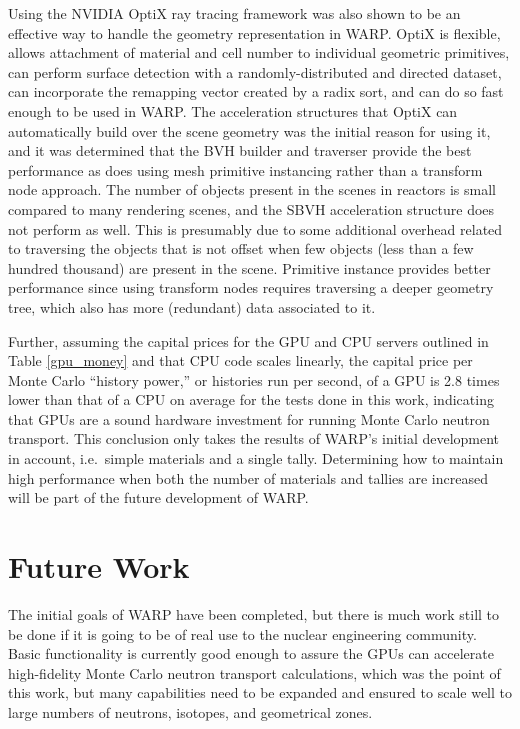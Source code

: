 Using the NVIDIA OptiX ray tracing framework was also shown to be an effective way to handle the geometry representation in WARP.  OptiX is flexible, allows attachment of material and cell number to individual geometric primitives, can perform surface detection with a randomly-distributed and directed dataset, can incorporate the remapping vector created by a radix sort, and can do so fast enough to be used in WARP.  The acceleration structures that OptiX can automatically build over the scene geometry was the initial reason for using it, and it was determined that the BVH builder and traverser provide the best performance as does using mesh primitive instancing rather than a transform node approach.  The number of objects present in the scenes in reactors is small compared to many rendering scenes, and the SBVH acceleration structure does not perform as well. This is presumably due to some additional overhead related to traversing the objects that is not offset when few objects (less than a few hundred thousand) are present in the scene.  Primitive instance provides better performance since using transform nodes requires traversing a deeper geometry tree, which also has more (redundant) data associated to it.

Further, assuming the capital prices for the GPU and CPU servers outlined in Table \ref{gpu_money} and that CPU code scales linearly, the capital price per Monte Carlo ``history power,'' or histories run per second, of a GPU is 2.8 times lower than that of a CPU on average for the tests done in this work, indicating that GPUs are a sound hardware investment for running Monte Carlo neutron transport.%
 This conclusion only takes the results of WARP's initial development in account, i.e.\ simple materials and a single tally.  Determining how to maintain high performance when both the number of materials and tallies are increased will be part of the future development of WARP.

\section{Future Work}

The initial goals of WARP have been completed, but there is much work still to be done if it is going to be of real use to the nuclear engineering community.  Basic functionality is currently good enough to assure the GPUs can accelerate high-fidelity Monte Carlo neutron transport calculations, which was the point of this work, but many capabilities need to be expanded and ensured to scale well to large numbers of neutrons, isotopes, and geometrical zones.

